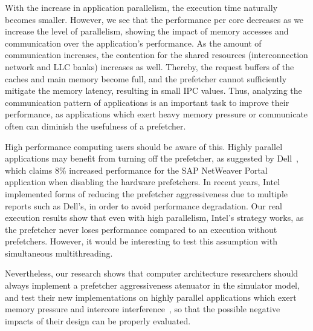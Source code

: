 \documentclass[AMA,final,STIX1COL]{WileyNJD-v2}
\begin{document}
With the increase in application parallelism, the execution time naturally becomes smaller. 
However, we see that the performance per core decreases as we increase the level of parallelism, showing the impact of memory accesses and communication over the application's performance.
As the amount of communication increases, the contention for the shared resources (interconnection network and LLC banks) increases as well.
Thereby, the request buffers of the caches and main memory become full, and the prefetcher cannot sufficiently mitigate the memory latency, resulting in small IPC values.
Thus, analyzing the communication pattern of applications is an important task to improve their performance, as applications which exert heavy memory pressure or communicate often can diminish the usefulness of a prefetcher.

High performance computing users should be aware of this.
Highly parallel applications may benefit from turning off the prefetcher, as suggested by Dell~\cite{SAPguide}, which claims 8\% increased performance for the SAP NetWeaver Portal application when disabling the hardware prefetchers.
In recent years, Intel implemented forms of reducing the prefetcher aggressiveness due to multiple reports such as Dell's, in order to avoid performance degradation.
Our real execution results show that even with high parallelism, Intel's strategy works, as the prefetcher never loses performance compared to an execution without prefetchers.
However, it would be interesting to test this assumption with simultaneous multithreading.

Nevertheless, our research shows that computer architecture researchers should always implement a prefetcher aggressiveness atenuator in the simulator model, and test their new implementations on highly parallel applications which exert memory pressure and intercore interference~\cite{ebrahimi2009coordinated}, so that the possible negative impacts of their design can be properly evaluated.
\end{document}
